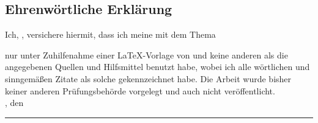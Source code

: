 \clearpage
\thispagestyle{empty}
\subsection*{Ehrenwörtliche Erklärung}
\label{app:erkl}


Ich, \autorName, versichere hiermit, dass ich meine \textbf{\betreff} mit dem
Thema
\begin{quote}
\textit{\kompletterTitel}
\end{quote}
nur unter Zuhilfenahme einer LaTeX-Vorlage von \cite{Macke} und keine anderen als die angegebenen Quellen und Hilfsmittel benutzt habe,
wobei ich alle wörtlichen und sinngemäßen Zitate als solche gekennzeichnet habe. Die Arbeit
wurde bisher keiner anderen Prüfungsbehörde vorgelegt und auch nicht veröffentlicht.\\[6ex]

\abgabeOrt, den \abgabeTermin


\rule[-0.2cm]{5.5cm}{0.5pt}

\textsc{\autorName}
